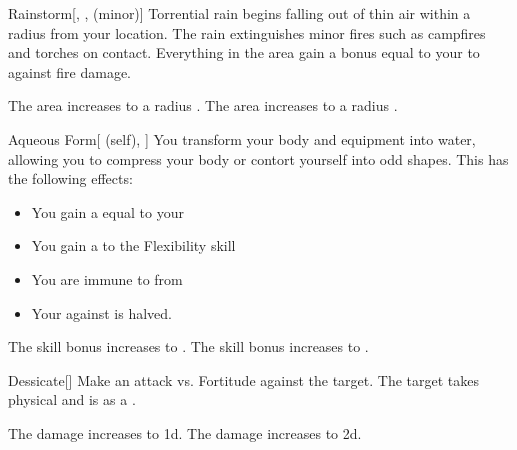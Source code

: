 \lowercase{\hypertarget{spell:Rainstorm}{}}\label{spell:Rainstorm}
\begin{freeability}[Rank 3]{\hypertarget{spell:Rainstorm}{Rainstorm}}[, ,  (minor)]
Torrential rain begins falling out of thin air within a \arealarge radius  from your location.
The rain extinguishes minor fires such as campfires and torches on contact.
Everything in the area gain a bonus equal to your  to  against fire damage.

\rankline
{} The area increases to a \areahuge radius .
 The area increases to a \areaext radius .
\end{freeability}
\vspace{0.25em}



\lowercase{\hypertarget{spell:Aqueous Form}{}}\label{spell:Aqueous Form}
\begin{attuneability}[Rank 4]{\hypertarget{spell:Aqueous Form}{Aqueous Form}}[ (self), ]
You transform your body and equipment into water, allowing you to compress your body or contort yourself into odd shapes.
This has the following effects:
\begin{itemize}
\item You gain a  equal to your 
\item You gain a   to the Flexibility skill
\item You are immune to  from 
\item Your  against  is halved.
\end{itemize}

\rankline
{} The skill bonus increases to .
 The skill bonus increases to .
\end{attuneability}
\vspace{0.25em}



\lowercase{\hypertarget{spell:Dessicate}{}}\label{spell:Dessicate}
\begin{freeability}[Rank 4]{\hypertarget{spell:Dessicate}{Dessicate}}[]
Make an attack vs. Fortitude against the target.
\hit The target takes physical  and is  as a .

\rankline
{} The damage increases to  \plus1d.
 The damage increases to  \plus2d.
\end{freeability}
\vspace{0.25em}



